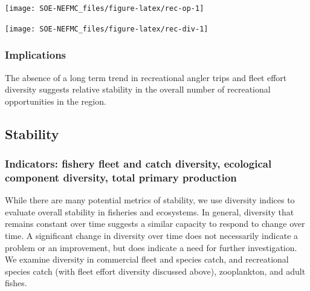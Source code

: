 \documentclass[
  10pt,
]{article}
\let\origfigure\figure
\let\endorigfigure\endfigure
\renewenvironment{figure}[1][2] {
    \expandafter\origfigure\expandafter[H]
} {
    \endorigfigure
}
\begin{document}
\begin{figure}

{\centering \texttt{[image: SOE-NEFMC\_files/figure-latex/rec-op-1]} 

}

\caption{Recreational effort in New England.}\label{fig:rec-op}
\end{figure}
\begin{figure}

{\centering \texttt{[image: SOE-NEFMC\_files/figure-latex/rec-div-1]} 

}

\caption{Recreational fleet effort diversity in New England.}\label{fig:rec-div}
\end{figure}

\hypertarget{implications-2}{%
\subsubsection{Implications}\label{implications-2}}

The absence of a long term trend in recreational angler trips and fleet effort diversity suggests relative stability in the overall number of recreational opportunities in the region.

\hypertarget{stability}{%
\subsection{Stability}\label{stability}}

\hypertarget{indicators-fishery-fleet-and-catch-diversity-ecological-component-diversity-total-primary-production}{%
\subsubsection{Indicators: fishery fleet and catch diversity, ecological component diversity, total primary production}\label{indicators-fishery-fleet-and-catch-diversity-ecological-component-diversity-total-primary-production}}

While there are many potential metrics of stability, we use diversity indices to evaluate overall stability in fisheries and ecosystems. In general, diversity that remains constant over time suggests a similar capacity to respond to change over time. A significant change in diversity over time does not necessarily indicate a problem or an improvement, but does indicate a need for further investigation. We examine diversity in commercial fleet and species catch, and recreational species catch (with fleet effort diversity discussed above), zooplankton, and adult fishes.
\end{document}
